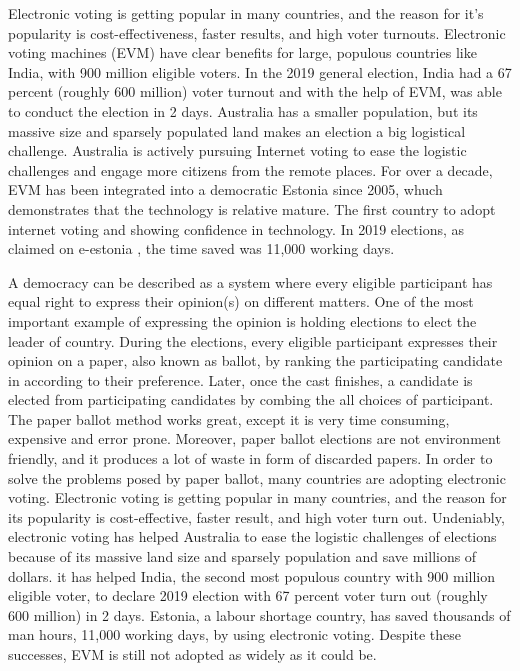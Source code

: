 Electronic voting is getting popular in many countries, and the reason for it's popularity is 
	cost-effectiveness, faster results, and high voter turnouts. 
	Electronic voting machines (EVM) have clear benefits for large, populous countries like India, with 900 million eligible voters. 
	In the 2019 general election, India had a 67 percent (roughly 600 million) voter turnout and with the help of EVM, was able to 
	conduct the election in 2 days. Australia has a smaller population, but its massive size and sparsely populated land makes 
an  election a big logistical challenge. Australia is actively pursuing Internet voting 
   to ease the logistic challenges and engage more citizens from the remote places. For over a decade, EVM has been integrated into a democratic Estonia
  since 2005, whuch demonstrates that the technology is relative mature. The first country to
   adopt internet voting and showing confidence in technology. In 2019 elections, 
   as claimed on e-estonia \citep{Estonia},  the time saved was 11,000 working days. 













A democracy can be described as a system where every eligible participant has equal right to express their opinion(s) on different matters. 
One of the most important example of expressing the opinion is holding elections to elect the leader of country. During the 
elections, every eligible participant expresses their opinion on a paper, also known as ballot, by ranking the participating candidate in 
according to their preference. Later, once the cast finishes, a candidate is elected from participating candidates by 
combing the all choices of participant.  The paper ballot method works great, except it is very time consuming, expensive and error prone. 
Moreover, paper ballot elections are not environment friendly, and it produces a lot of waste in form of discarded papers. 
In order to solve the problems posed by paper ballot, many countries are adopting electronic voting. Electronic voting is 
getting popular in many countries, and the reason for its popularity is cost-effective, faster result, and high voter turn out. Undeniably, electronic voting has helped Australia to ease the logistic challenges of elections because of its massive land size and sparsely 
population and save millions of dollars.  it has helped India, the second most populous country with 900 million eligible voter, to declare 
2019 election with 67 percent voter turn out (roughly 600 million) in 2 days. Estonia, a labour shortage country, has saved 
thousands of man hours, 11,000 working days, by using electronic voting. Despite these successes, EVM is still not adopted as widely as it could be. 

